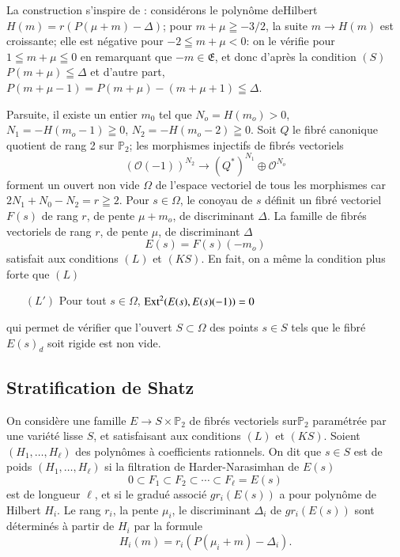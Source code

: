 La construction s'inspire de \cite{chap5-key11}: consid\'erons le
polyn\^ome de\break Hilbert $H(m)=r(P(\mu+m)-\Delta)$; pour $m+\mu\geqq
-3/2$, la suite $m\to H(m)$ est croissante; elle est n\'egative pour
$-2\leqq m+\mu < 0$: on le v\'erifie pour $1\leqq m+\mu\leqq 0$ en
remarquant que $-m\in \mathfrak{E}$, et donc d'apr\`es la condition
$(S)$ $P(m+\mu)\leqq \Delta$ et d'autre part,
$P(m+\mu-1)=P(m+\mu)-(m+\mu+1)\leqq \Delta$.

Par\pageoriginale suite, il existe un entier $m_{0}$ tel que $N_{o}=H(m_{o})>0$,
$N_{1}=-H(m_{o}-1)\geqq 0$, $N_{2}=-H(m_{o}-2)\geqq 0$. Soit $Q$ le
fibr\'e canonique quotient de rang 2 sur $\mathbb{P}_{2}$; les
morphismes injectifs de fibr\'es vectoriels
$$
(\mathscr{O}(-1))^{N_{2}}\to (Q^{*})^{N_{1}}\oplus \mathscr{O}^{N_{o}}
$$
forment un ouvert non vide $\Omega$ de l'espace vectoriel de tous les
morphismes car $2N_{1}+N_{0}-N_{2}=r\geqq 2$. Pour $s\in \Omega$, le
conoyau de $s$ d\'efinit un fibr\'e vectoriel $F(s)$ de rang $r$, de
pente $\mu+m_{o}$, de discriminant $\Delta$. La famille de fibr\'es
vectoriels de rang $r$, de pente $\mu$, de discriminant $\Delta$
$$
E(s)=F(s)(-m_{o})
$$
satisfait aux conditions $(L)$ et $(KS)$. En fait, on a m\^eme la
condition plus forte que $(L)$
\begin{itemize}
\item[$(L')$] Pour tout $s\in \Omega$, $\operatorname{Ext}^{2}(E(s),E(s)(-1))=0$
\end{itemize}
qui permet de v\'erifier que l'ouvert $S\subset \Omega$ des points
$s\in S$ tels que le fibr\'e $E(s)_{d}$ soit rigide est non vide.

\subsection{Stratification de Shatz}\label{chap5-sec7.2}

On consid\`ere une famille $E\to S\times \mathbb{P}_{2}$ de fibr\'es
vectoriels sur\pageoriginale $\mathbb{P}_{2}$ para\-m\'etr\'ee par une
vari\'et\'e lisse $S$, et satisfaisant aux conditions $(L)$ et
$(KS)$. Soient $(H_{1},\ldots,H_{\ell})$ des polyn\^omes \`a
coefficients rationnels. On dit que $s\in S$ est de poids
$(H_{1},\ldots,H_{\ell})$ si la filtration de Harder-Narasimhan de
$E(s)$ 
$$
0\subset F_{1}\subset F_{2}\subset\cdots\subset F_{\ell}=E(s)
$$
est de longueur $\ell$, et si le gradu\'e associ\'e $gr_{i}(E(s))$ a
pour polyn\^ome de Hilbert $H_{i}$. Le rang $r_{i}$, la pente
$\mu_{i}$, le discriminant $\Delta_{i}$ de $gr_{i}(E(s))$ sont
d\'etermin\'es \`a partir de $H_{i}$ par la formule 
$$
H_{i}(m)=r_{i}(P(\mu_{i}+m)-\Delta_{i}).
$$

